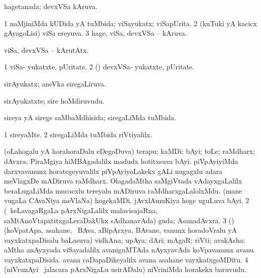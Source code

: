 \bentry
{} 
\gl{\gu}
\expl{}
\bmng
 hagetanada; devxVSa kAruva. 
\emng
\eentry

\bentry
{} 
\gl{\gu}
\expl{}
\bmng
\bnum
\num{1} naMjiniMda kUDida yA tuMbida; viSayukatx; viSapUrita. 
\num{2} (kuTuki yA kacicx gAyagoLisi) viSa ereyuva. 
\num{3} hage, viSa, devxVSa -- kAruva. 
\enum
\emng
\eentry

\bentry
{} 
\gl{\kirxvi}
\expl{}
\bmng
 viSa, devxVSa -- kArutAtx. 
\emng
\eentry

\bentry
{} 
\gl{\nA}
\expl{}
\bmng
\bnum
\num{1} viSa- yukatxte, pUritate. 
\num{2} (\rUpa) devxVSa- yukatxte, pUritate. 
\enum
\emng
\eentry

\bentry
{} 
\gl{\gu}
\expl{}
\bmng
 sirAyukatx; aneVka siregaLiruva. 
\emng
\eentry

\bentry
{} 
\gl{\nA}
\expl{}
\bmng
 sirAyukatxte; sire hoMdiruvudu. 
\emng
\eentry

\bentry
{} 
\gl{\gu}
\expl{}
\bmng
 sireya yA sirege saMbaMdhisida; siregaLiMda tuMbida. 
\emng
\eentry

\bentry
{} 
\gl{\kirxvi}
\expl{}
\bmng
\bnum
\num{1} sireyaMte. 
\num{2} siregaLiMda tuMbida riVtiyalilx. 
\enum
\emng
\eentry

\bentry
{} 
\gl{\nA}
\expl{}
\bmng
\bnum
{} (oLahogalu yA horahoraDalu eDegoDuva) terapu; kaMDi; bAyi; toLe; raMdharx; dAvxra: 
\banum
{} PiraMgiya hiMBAgadalilx madudx hotitxsuva bAyi. 
 piVpAyiyiMda darxvavanunx horategeyuvalilx piVpAyiyoLakekx gALi nugagxlu adara meVlagxDe mADiruva raMdharx. 
 OlagadaMtha saMgiVtada vAdayxgaLalilx beraLugaLiMda mucacxlu tereyalu mADiruva raMdharxgaLalolxMdu. 
 (mane \mo vugaLa CAvaNiya meVlaNa) hogekaMDi. 
 jAvxlAmuKiya hoge uguLuva bAyi. 
\eanum
\numie
\num{2} (\kanmu\ keLavagaRgaLa pArxNigaLalilx malavisajaRna, saMtAnoVtapxtitxgaLeraDakUkx sAdhanavAda) guda; AsanadAvxra. 
\num{3} (\rUpa) (koVpatApa, asahane, \mo\ BAva, aBipArxya, BAvane, \mo vanunx horadoVralu yA vayxkatxpaDisalu baLasuva) vidhAna; upAya; dAri; mAgaR; riVti; avakAsha:  aMtha anAyxyada viSayadalilx avaniguMTAda nAyxyavAda koVpavanunx avanu vayxkatxpaDisida.  avana caDapaDikeyalilx avana asahane vayxkatxgoMDitu. 
\num{4} (niVrunAyi \mo\ jalacara pArxNigaLu usirADalu) niVriniMda horakekx baruvudu. 
\enum
\emng
\eentry


